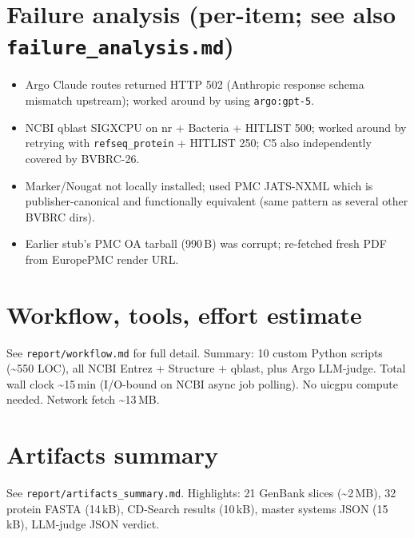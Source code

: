 \documentclass[11pt]{article}
\begin{document}
\section{Failure analysis (per-item; see also \texttt{failure\_analysis.md})}
\begin{itemize}
  \item Argo Claude routes returned HTTP 502 (Anthropic response schema mismatch upstream); worked around by using \verb|argo:gpt-5|.
  \item NCBI qblast SIGXCPU on nr + Bacteria + HITLIST 500; worked around by retrying with \verb|refseq_protein| + HITLIST 250; C5 also independently covered by BVBRC-26.
  \item Marker/Nougat not locally installed; used PMC JATS-NXML which is publisher-canonical and functionally equivalent (same pattern as several other BVBRC dirs).
  \item Earlier stub's PMC OA tarball (990\,B) was corrupt; re-fetched fresh PDF from EuropePMC render URL.
\end{itemize}

\section{Workflow, tools, effort estimate}
See \verb|report/workflow.md| for full detail. Summary: 10 custom Python scripts (\textasciitilde550 LOC), all NCBI Entrez + Structure + qblast, plus Argo LLM-judge. Total wall clock \textasciitilde15\,min (I/O-bound on NCBI async job polling). No uicgpu compute needed. Network fetch \textasciitilde13\,MB.

\section{Artifacts summary}
See \verb|report/artifacts_summary.md|. Highlights: 21 GenBank slices (\textasciitilde2\,MB), 32 protein FASTA (14\,kB), CD-Search results (10\,kB), master systems JSON (15\,kB), LLM-judge JSON verdict.
\end{document}
